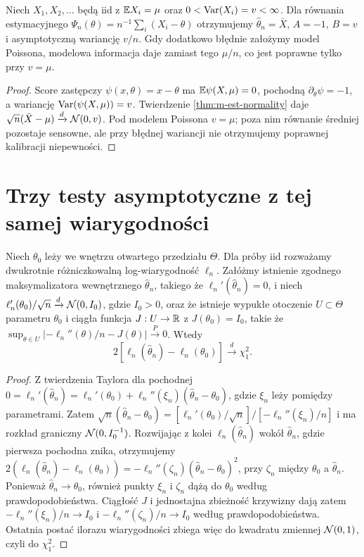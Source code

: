 \begin{stwierdzenie}
Niech $X_1,X_2,\ldots$ będą iid z $\mathbb E X_i=\mu$ oraz
$0<\operatorname{Var}(X_i)=v<\infty$. Dla równania estymacyjnego
$\Psi_n(\theta)=n^{-1}\sum_i(X_i-\theta)$ otrzymujemy
$\widehat\theta_n=\bar X$, $A=-1$, $B=v$ i
asymptotyczną wariancję $v/n$. Gdy dodatkowo błędnie
założymy model Poissona, modelowa informacja daje zamiast
tego $\mu/n$, co jest poprawne tylko przy $v=\mu$.
\end{stwierdzenie}
\begin{proof}
Score zastępczy $\psi(x,\theta)=x-\theta$ ma
$\mathbb E\psi(X,\mu)=0$, pochodną $\partial_\theta\psi=-1$,
a wariancję $\operatorname{Var}(\psi(X,\mu))=v$. Twierdzenie
\ref{thm:m-est-normality} daje
$\sqrt n(\bar X-\mu)\xrightarrow{d}\mathcal N(0,v)$.
Pod modelem Poissona $v=\mu$; poza nim równanie średniej
pozostaje sensowne, ale przy błędnej wariancji nie otrzymujemy
poprawnej kalibracji niepewności.
\end{proof}

\section{Trzy testy asymptotyczne z tej samej wiarygodności}
\begin{twierdzenie}
\label{thm:wilks-one}
Niech $\theta_0$ leży we wnętrzu otwartego przedziału
$\Theta$. Dla próby iid rozważamy dwukrotnie różniczkowalną
log-wiarygodność $\ell_n$. Załóżmy istnienie zgodnego
maksymalizatora wewnętrznego $\widehat\theta_n$, takiego że
$\ell_n'(\widehat\theta_n)=0$, i niech
$\ell_n'(\theta_0)/\sqrt n\xrightarrow{d}\mathcal N(0,I_0)$,
gdzie $I_0>0$, oraz że istnieje wypukłe otoczenie
$U\subset\Theta$ parametru $\theta_0$ i ciągła funkcja
$J:U\to\mathbb R$ z $J(\theta_0)=I_0$, takie że
$\sup_{\theta\in U}|-\ell_n''(\theta)/n-J(\theta)|
\xrightarrow{P}0$. Wtedy
\[
2[\ell_n(\widehat\theta_n)-\ell_n(\theta_0)]
\xrightarrow{d}\chi_1^2.
\]
\end{twierdzenie}
\begin{proof}
Z twierdzenia Taylora dla pochodnej
$0=\ell_n'(\widehat\theta_n)
=\ell_n'(\theta_0)+\ell_n''(\xi_n)(\widehat\theta_n-
\theta_0)$, gdzie $\xi_n$ leży pomiędzy parametrami.
Zatem $\sqrt n(\widehat\theta_n-\theta_0)
=[\ell_n'(\theta_0)/\sqrt n]/[-\ell_n''(\xi_n)/n]$
i ma rozkład graniczny $\mathcal N(0,I_0^{-1})$.
Rozwijając z kolei $\ell_n(\widehat\theta_n)$ wokół
$\widehat\theta_n$, gdzie pierwsza pochodna znika, otrzymujemy
$2(\ell_n(\widehat\theta_n)-\ell_n(\theta_0))
= -\ell_n''(\zeta_n)(\widehat\theta_n-\theta_0)^2$,
przy $\zeta_n$ między $\theta_0$ a $\widehat\theta_n$.
Ponieważ $\widehat\theta_n\to\theta_0$, również punkty
$\xi_n$ i $\zeta_n$ dążą do $\theta_0$ według
prawdopodobieństwa. Ciągłość $J$ i jednostajna zbieżność
krzywizny dają zatem
$-\ell_n''(\xi_n)/n\to I_0$ i
$-\ell_n''(\zeta_n)/n\to I_0$ według
prawdopodobieństwa. Ostatnia postać ilorazu wiarygodności
zbiega więc do kwadratu zmiennej $\mathcal N(0,1)$,
czyli do $\chi_1^2$.
\end{proof}

